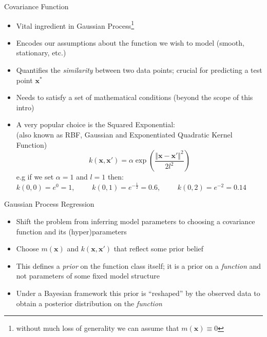 \documentclass[pdf]{beamer}
\begin{document}
\begin{frame}{Covariance Function}
\begin{itemize}\addtolength{\itemsep}{0.2\baselineskip}
	\item<1-> Vital ingredient in Gaussian Process\footnote{without much loss of generality we can assume that $m(\mathbf{x}) \equiv 0$} 
	\item<2-> Encodes our assumptions about the function we wish to model (smooth, stationary, etc.)
	\item<3-> Quantifies the \textit{similarity} between two data points; crucial for predicting a test point $\mathbf{x^*}$
	\item<4-> Needs to satisfy a set of mathematical conditions {\tiny (beyond the scope of this intro)}
	\item<5-> A very popular choice is the Squared Exponential:\\ 
	{\tiny (also known as RBF, Gaussian and Exponentiated Quadratic Kernel Function)} 
	$$
	k(\mathbf{x},\mathbf{x}') = \alpha \exp \left( {\frac{\Vert \mathbf{x} - \mathbf{x'} \Vert^2}{2l^2}} \right)
	$$
	e.g if we set $\alpha=1$ and $l=1$ then:\\
 	{\footnotesize $k(0, 0) = e^0 = 1$,\ \ \ \ \ $k(0, 1) = e^{-\frac{1}{2}} = 0.6$,\ \ \ \ \ $k(0, 2) = e^{-2} = 0.14$}
\end{itemize}
\end{frame}

\begin{frame}{Gaussian Process Regression}
\begin{itemize}\addtolength{\itemsep}{1\baselineskip}
	\item<1-> Shift the problem from inferring model parameters to choosing a covariance function and its (hyper)parameters
	\item<2-> Choose $m(\mathbf{x})$ and $k(\mathbf{x},\mathbf{x}')$ that reflect some prior belief
	\item<3-> This defines a \textit{prior} on the function class itself; it is a prior on a \textit{function} and not 
	parameters of some fixed model structure
	\item<4-> Under a Bayesian framework this prior is ``reshaped'' by the observed data to obtain a posterior distribution
	on the \textit{function}
\end{itemize}
\end{frame}
\end{document}

